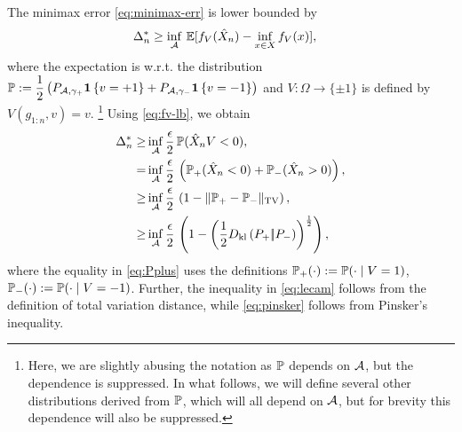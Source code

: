 The minimax error \eqref{eq:minimax-err} is lower bounded by
\begin{align}
\MoveEqLeft 
\Delta_n^* %
  \ge  \inf_{\A} \,  \E[f_V(\hat X_n) - \inf_{x \in X}
  f_V(x)],\label{eq:avg-bd}
  \end{align}
where the expectation is w.r.t. the distribution $\P:= \dfrac{1}{2} \left(P_{\A, \gamma_+} \indic{v=+1} + P_{\A, \gamma_-}\indic{v=-1}\right)$ and $V: \Omega \to \{\pm 1 \}$ is defined by $V(g_{1:n},v) = v$.%
\footnote{Here, we are slightly abusing the notation as $\P$ depends on $\A$, but the dependence is suppressed.
In what follows, we will define several other distributions derived from $\P$, which will all depend on $\A$, but
for brevity this dependence will also be suppressed.}
Using \eqref{eq:fv-lb}, we obtain
\begin{align}
\Delta_n^*  \ge & \inf_{\A} \dfrac{\epsilon}{2}\,  \P(\hat X_n V < 0), \label{eq:strong-convex-bd}\\
  = & \inf_{\A} \dfrac{\epsilon }{2} \, \left(\P_{+}(\hat X_n < 0) + \P_{-}(\hat X_n > 0)\right), \label{eq:Pplus}\\
  \ge &\inf_{\A} \dfrac{\epsilon }{2} \,\left(1 - \tvnorm{\P_{+}- \P_{-}}\right), \label{eq:lecam}\\
  \ge &\inf_{\A} \dfrac{\epsilon }{2}  \,\left( 1 - \left(\frac12\dkl{P_{+}}{P_{-}}\right)^{\frac{1}{2}}\right), \label{eq:pinsker}
\end{align}
where 
the equality in \eqref{eq:Pplus} uses the definitions $\P_{+}(\cdot)
:= \P(\cdot\mid V=1)$, $\P_{-}(\cdot) := \P(\cdot\mid
V=-1)$. Further, the inequality in \eqref{eq:lecam} follows from the definition of total variation distance, while \eqref{eq:pinsker} follows from Pinsker's inequality. %






